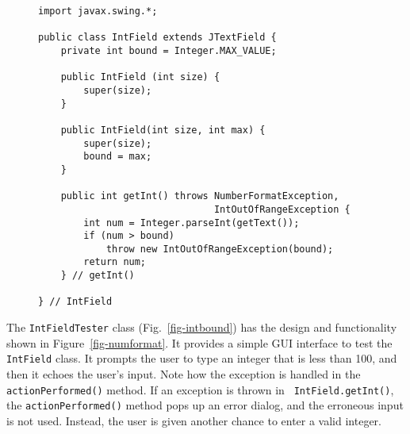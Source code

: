 \begin{figure}[tb]
\jjjprogstart
\begin{jjjlisting}
\begin{lstlisting}
import javax.swing.*;

public class IntField extends JTextField {
    private int bound = Integer.MAX_VALUE;

    public IntField (int size) {
        super(size);
    }

    public IntField(int size, int max) {
        super(size);
        bound = max;
    }

    public int getInt() throws NumberFormatException, 
                               IntOutOfRangeException {
        int num = Integer.parseInt(getText());
        if (num > bound)
            throw new IntOutOfRangeException(bound);
        return num;
    } // getInt()

} // IntField
\end{lstlisting}
\end{jjjlisting}
\end{figure}


The {\tt IntFieldTester} class (Fig.~\ref{fig-intbound}) has the
design and functionality shown in Figure~\ref{fig-numformat}. It provides
a simple GUI interface to test the {\tt IntField} class.  It prompts
the user to type an integer that is less than 100, and then it
echoes the user's input.  Note how the exception is handled in the
{\tt actionPerformed()} method.  If an exception is thrown in {\tt
IntField.getInt()}, the {\tt actionPerformed()} method pops up an
error dialog, and the erroneous input is not used.  Instead, the user is
given another chance to enter a valid integer.



